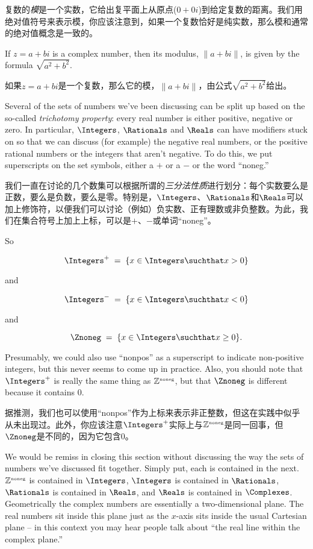复数的\emph{模}是一个实数，它给出复平面上从原点($0+0i$)到给定复数的距离。我们用绝对值符号来表示模，你应该注意到，如果一个复数恰好是纯实数，那么模和通常的绝对值概念是一致的。

If $z = a + bi$ is a complex number, then its modulus, $\|a + bi \|$,
is given by the formula $\sqrt{a^2+b^2}$.

如果$z = a + bi$是一个复数，那么它的模，$\|a + bi \|$，由公式$\sqrt{a^2+b^2}$给出。

Several of the sets of numbers we've been discussing can be split
up based on the so-called \emph{trichotomy property}:
every real number is either positive, negative or zero. In particular,
$\Integers$, $\Rationals$ and $\Reals$ can have modifiers stuck on so
that we can discuss (for example) the negative real numbers, or the
positive rational numbers or the integers that aren't negative.
To do this, we put superscripts on the set symbols, either a $+$ 
or a $-$ or the word ``noneg.''

我们一直在讨论的几个数集可以根据所谓的\emph{三分法性质}进行划分：每个实数要么是正数，要么是负数，要么是零。特别是，$\Integers$、$\Rationals$和$\Reals$可以加上修饰符，以便我们可以讨论（例如）负实数、正有理数或非负整数。为此，我们在集合符号上加上上标，可以是$+$、$-$或单词“noneg”。

So 

\[ \Integers^+ \; = \; \{ x \in \Integers \suchthat x > 0 \} \]

\noindent and 

\[ \Integers^- \; = \; \{ x \in \Integers \suchthat x < 0 \} \]

\noindent and 

\[ \Znoneg \; = \; \{ x \in \Integers \suchthat x \geq 0 \}. \]

Presumably, we could also use ``nonpos'' as a superscript to indicate
non-positive integers, but this never seems to come up in practice.
Also, you should note that $\Integers^+$  is really the same thing
as ${\mathbb Z}^{\mbox{\tiny noneg}}$, but that  $\Znoneg$  is different because it 
contains $0$.

据推测，我们也可以使用“nonpos”作为上标来表示非正整数，但这在实践中似乎从未出现过。此外，你应该注意$\Integers^+$实际上与${\mathbb Z}^{\mbox{\tiny noneg}}$是同一回事，但$\Znoneg$是不同的，因为它包含$0$。

We would be remiss in closing this section without discussing the
way the sets of numbers we've discussed fit together. Simply put,
each is contained in the next.  ${\mathbb Z}^{\mbox{\tiny noneg}}$ is contained in $\Integers$, 
$\Integers$ is contained in $\Rationals$, $\Rationals$ is contained
in $\Reals$, and $\Reals$ is contained in $\Complexes$. Geometrically the complex numbers are essentially a two-dimensional
plane.  The real numbers sit inside this plane just as the $x$-axis
sits inside the usual Cartesian plane -- in this context you may
hear people talk about ``the real line within the complex plane.''

